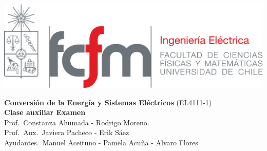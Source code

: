 \documentclass[
  11pt,
  letterpaper,
   addpoints,
   answers
  ]{exam}
\begin{document}
\noindent
\begin{minipage}{0.47\textwidth}
\includegraphics[width=\textwidth]{../fcfm_die}
\end{minipage}
\begin{minipage}{0.53\textwidth}
\begin{center} 
\large\textbf{Conversión de la Energía y Sistemas Eléctricos } (EL4111-1) \\
\large\textbf{Clase auxiliar Examen} \\
\small Prof.~Constanza Ahumada - Rodrigo Moreno.\\
\small Prof.~Aux.~Javiera Pacheco - Erik Sáez\\
\small Ayudantes.~Manuel Aceituno - Pamela Acuña - Alvaro Flores\\
\end{center}
\end{minipage}

\vspace{0.5cm}
\noindent
\vspace{.85cm}
\end{document}
